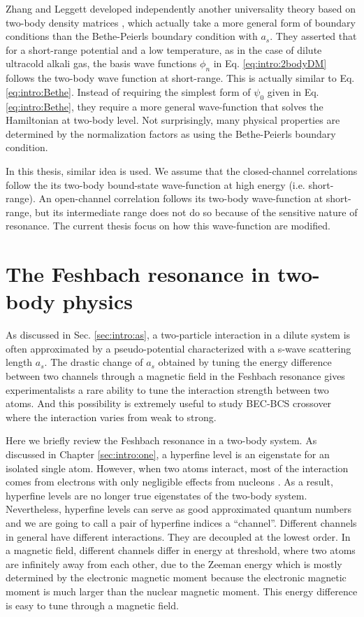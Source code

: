 Zhang and Leggett developed independently another universality theory based on two-body density matrices \linebreak[2] \cite{shizhongUniv}, which actually take a more general form of boundary conditions than the Bethe-Peierls boundary condition with $a_{s}$.   They asserted that for a short-range potential and a low temperature, as in the case of  dilute ultracold alkali gas, the basis wave functions $\phi_n$  in Eq. \eqref{eq:intro:2bodyDM} follows the two-body wave function at short-range. This is actually similar to Eq. \eqref{eq:intro:Bethe}.  Instead of requiring the simplest form of $\psi_0$ given in Eq. \eqref{eq:intro:Bethe}, they require a more general wave-function that solves the  Hamiltonian at two-body level.  Not surprisingly, many physical properties are determined by the normalization factors  as using the Bethe-Peierls boundary condition.  

In this thesis, similar idea is used.  We assume that the closed-channel correlations follow the its two-body bound-state wave-function at high energy (i.e. short-range).   An open-channel correlation follows its two-body  wave-function at short-range, but its intermediate range does not do so because of the sensitive nature of resonance.   The current thesis focus on how this wave-function are modified. 
 
 
 \chapter{The  Feshbach resonance in two-body physics\label{sec:intro:twobody}}
 As discussed in Sec. \ref{sec:intro:as}, a two-particle interaction in a dilute system is often approximated by a pseudo-potential characterized with a s-wave scattering length $a_{s}$.   The drastic  change  of $a_{s}$  obtained by tuning the energy difference  between two channels  through a magnetic field in the Feshbach resonance gives  experimentalists a rare ability to tune the interaction strength between two atoms.  And this possibility is extremely useful to study BEC-BCS crossover where the interaction varies from weak to strong.  
 
Here we briefly review the Feshbach resonance in a two-body system.   As discussed in Chapter \ref{sec:intro:one}, a hyperfine level is an eigenstate for an isolated single atom.  However, when two atoms interact, most of the interaction comes from  electrons with only negligible effects from nucleons .  As a result, hyperfine levels are no longer true eigenstates of the two-body system.  Nevertheless, hyperfine levels can serve as  good approximated quantum numbers and we are going to call a pair of hyperfine indices a ``channel''.  Different channels in general have different  interactions.  They are decoupled at the lowest order.  In a magnetic field, different channels differ in energy at threshold, where two atoms are infinitely away from each other, due to the Zeeman energy which is mostly determined by the electronic magnetic moment because  the electronic magnetic moment is much larger than the nuclear magnetic moment.  This energy difference is easy to tune through a magnetic field.  

